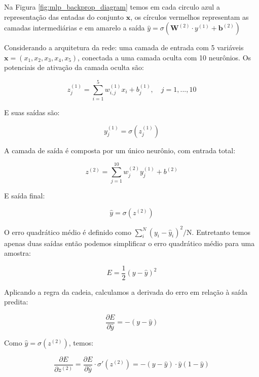 \documentclass[12pt,a4paper,oneside]{report}
\newcommand{\fig}[1]{Figura \ref{#1}}
\begin{document}
Na \fig{fig:mlp_backprop_diagram} temos em cada circulo azul a representação das entadas do conjunto $\mathbf{x}$, os círculos vermelhos representam as camadas intermediárias e em amarelo a saída $\hat{y} = \sigma(\mathbf{W}^{(2)} \cdot y^{(1)} + \mathbf{b}^{(2)})$
	
	Considerando a arquitetura da rede: uma camada de entrada com 5 variáveis $\mathbf{x} = (x_1, x_2, x_3, x_4, x_5)$, conectada a uma camada oculta com 10 neurônios. Os potenciais de ativação da camada oculta são:
	
	\begin{equation}
		z_j^{(1)} = \sum_{i=1}^{5} w_{i,j}^{(1)} x_i + b_j^{(1)}, \quad j = 1, ..., 10
	\end{equation}
	
	E suas saídas são:
	
	\begin{equation}
		y_j^{(1)} = \sigma(z_j^{(1)})
	\end{equation}
	
	A camada de saída é composta por um único neurônio, com entrada total:
	
	\begin{equation}
		z^{(2)} = \sum_{j=1}^{10} w_j^{(2)} y_j^{(1)} + b^{(2)}
	\end{equation}
	
	E saída final:
	
	\begin{equation}
		\hat{y} = \sigma(z^{(2)})
	\end{equation}
	
	O erro quadrático médio é definido como $\sum_{i}^{N} (y_i - \hat{y}_i)^2/\text{N}$. Entretanto temos apenas duas saídas então podemos simplificar o erro quadrático médio para uma amostra:
	
	\begin{equation}
		E = \frac{1}{2}(y - \hat{y})^2
	\end{equation}
	
	Aplicando a regra da cadeia, calculamos a derivada do erro em relação à saída predita:
	
	\begin{equation}
		\frac{\partial E}{\partial \hat{y}} = -(y - \hat{y})
	\end{equation}
	
	Como $\hat{y} = \sigma(z^{(2)})$, temos:
	
	\begin{equation}
		\frac{\partial E}{\partial z^{(2)}} = \frac{\partial E}{\partial \hat{y}} \cdot \sigma'(z^{(2)}) = -(y - \hat{y}) \cdot \hat{y}(1 - \hat{y})
	\end{equation}
	
\end{document}
